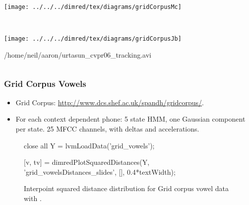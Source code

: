 \begin{frame}
\begin{columns}
\begin{center}
{\begin{minipage}[b][0.8\textheight][t]{0.5\columnwidth}
          \begin{minipage}[t][0.3\textheight]{1\columnwidth}%
            \begin{center}
              \texttt{[image: ../../../dimred/tex/diagrams/gridCorpusMc]}
            \end{center}%
          \end{minipage}\\
          \begin{minipage}[t][0.3\textheight]{1\columnwidth}%
            \begin{center}
              \texttt{[image: ../../../dimred/tex/diagrams/gridCorpusJb]}
            \end{center}%
          \end{minipage}%
        \end{minipage}}{/home/neil/aaron/urtasun_cvpr06_tracking.avi}
    \end{center}
    
  \end{columns}
  
\end{frame}

\begin{frame}[fragile]
  \frametitle{Grid Corpus Vowels}
  \begin{itemize}
    \item Grid Corpus: \url{http://www.dcs.shef.ac.uk/spandh/gridcorpus/}.
    \item For each context dependent phone: 5 state HMM, one Gaussian component
      per state. 25 MFCC channels, with deltas and accelerations. 
  \end{itemize}
  \begin{center}
  \begin{figure}
    \begin{matlab}
    close all
    Y = lvmLoadData('grid_vowels');
    
    [v, tv] = dimredPlotSquaredDistances(Y, 'grid_vowelsDistances_slides', [], 0.4*textWidth);
    \end{matlab}
  \begin{center}
  \end{center}
  
  \caption{Interpoint squared distance distribution for Grid corpus vowel data with \captionInfo.}
  
\end{figure}

  \end{center}


\end{frame}


